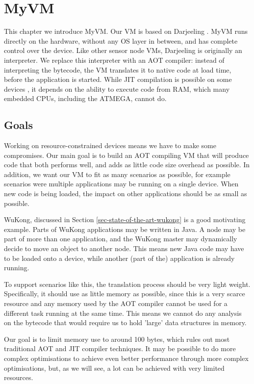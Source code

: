 \chapter{MyVM}

This chapter we introduce MyVM. Our VM is based on Darjeeling \cite{Brouwers:2009cj}. MyVM runs directly on the hardware, without any OS layer in between, and has complete control over the device. Like other sensor node VMs, Darjeeling is originally an interpreter. We replace this interpreter with an AOT compiler: instead of interpreting the bytecode, the VM translates it to native code at load time, before the application is started. While JIT compilation is possible on some devices \cite{Ellul:2012thesis}, it depends on the ability to execute code from RAM, which many embedded CPUs, including the ATMEGA, cannot do.

\section{Goals}
\label{sec-myvm-goals}
Working on resource-constrained devices means we have to make some compromises. Our main goal is to build an AOT compiling VM that will produce code that both performs well, and adds as little code size overhead as possible. In addition, we want our VM to fit as many scenarios as possible, for example scenarios were multiple applications may be running on a single device. When new code is being loaded, the impact on other applications should be as small as possible.

WuKong, discussed in Section \ref{sec-state-of-the-art-wukong} is a good motivating example. Parts of WuKong applications may be written in Java. A node may be part of more than one application, and the WuKong master may dynamically decide to move an object to another node. This means new Java code may have to be loaded onto a device, while another (part of the) application is already running.

To support scenarios like this, the translation process should be very light weight. Specifically, it should use as little memory as possible, since this is a very scarce resource and any memory used by the AOT compiler cannot be used for a different task running at the same time. This means we cannot do any analysis on the bytecode that would require us to hold 'large' data structures in memory.

Our goal is to limit memory use to around 100 bytes, which rules out most traditional AOT and JIT compiler techniques. It may be possible to do more complex optimisations to achieve even better performance through more complex optimisations, but, as we will see, a lot can be achieved with very limited resources.


